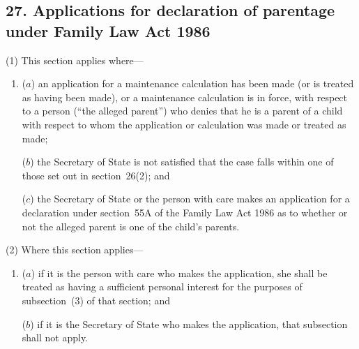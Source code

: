 \documentclass[12pt,a4paper]{article}
\begin{document}
%
%
%
%
%
%

\subsection{27. Applications for declaration of parentage under Family Law Act 1986}

(1) This section applies where—
\begin{enumerate}\item[]
($a$) an application for a maintenance calculation has been made (or is treated as having been made), or a maintenance calculation is in force, with respect to a person (“the alleged parent”) who denies that he is a parent of a child with respect to whom the application or calculation was made or treated as made;

($b$) the Secretary of State is not satisfied that the case falls within one of those set out in section~26(2); and

($c$) the Secretary of State or the person with care makes an application for a declaration under section~55A of the Family Law Act 1986 as to whether or not the alleged parent is one of the child’s parents.
\end{enumerate}

(2) Where this section applies—
\begin{enumerate}\item[]
($a$) if it is the person with care who makes the application, she shall be treated as having a sufficient personal interest for the purposes of subsection~(3)  of that section; and

($b$) if it is the Secretary of State who makes the application, that subsection shall not apply.
\end{enumerate}
\end{document}
